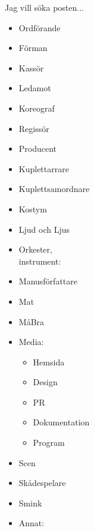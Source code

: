 \begin{multicols}{2}
    {\normalsize Jag vill söka posten...}
    \footnotesize
    \begin{multicols}{2}
        \begin{itemize}
        \setlength{\itemindent}{-1.4em}
        \setlength\itemsep{0.75pt}
            \item Ordförande
            \item Förman
            \item Kassör
            \item Ledamot
            \item Koreograf
            \item Regissör
            \item Producent            
            \item Kuplettarrare
            \item Kuplettsamordnare
            \item Kostym
            \item Ljud och Ljus
            \item Orkester,\\ \hspace{-1.5em}instrument:\\\hspace{-1.5em}\underline{\hspace{1.5cm}}
            \columnbreak
            \item Manusförfattare
            \item Mat
            \item MåBra
            \item Media:
            \vspace{-0.3pt}
            \begin{itemize}
                \setlength{\itemindent}{-3.2em}
                \setlength\itemsep{0.2pt}
                \item Hemsida
                \item Design
                \item PR
                \item Dokumentation
                \item Program
            \end{itemize}
            \item Scen
            \item Skådespelare
            \item Smink
            \item Annat: \\\hspace{-1.5em}\underline{\hspace{1.5cm}}

\end{itemize}
\end{multicols}
\end{multicols}
